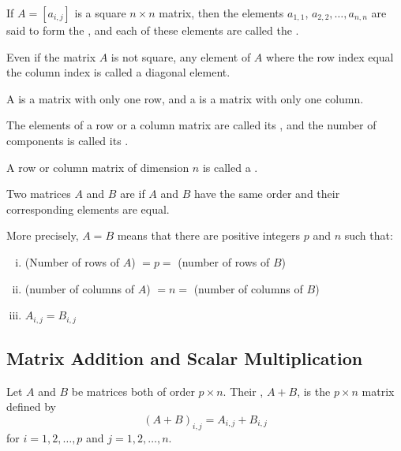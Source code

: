 \begin{definition}
  If $A = \left[a_{i, j}\right]$ is a square $n \times n$ matrix, then the elements $a_{1,1}$, $a_{2,2}, \dots, a_{n,n}$
  are said to form the , and each of these elements are called the
  .
\end{definition}

\begin{remark}
 Even if the matrix $A$ is not square, any element of $A$ where the row index equal the column index is called a 
 diagonal element.
\end{remark}

\begin{definition}
  A  is a matrix with only one row, and a  is a matrix with only one column.
\end{definition}

\begin{definition}
  The elements of a row or a column matrix are called its , and the number of components is called its .
\end{definition}

\begin{definition}
  A row or column matrix of dimension $n$ is called a .
\end{definition}

\begin{definition}
  Two matrices $A$ and $B$ are  if $A$ and $B$ have the same order and their corresponding elements are equal.

  More precisely, $A = B$ means that there are positive integers $p$ and $n$ such that:
  \begin{enumerate}[(i)]
    \item (Number of rows of $A$) $= p = $ (number of rows of $B$)
    \item (number of columns of $A$) $= n =$ (number of columns of $B$)
    \item $A_{i, j} = B_{i, j}$
  \end{enumerate}
\end{definition}

\subsection{Matrix Addition and Scalar Multiplication}
\begin{definition}
  Let $A$ and $B$ be matrices both of order $p \times n$.
  Their , $A + B$, is the $p \times n$ matrix defined by
  \begin{equation*}
    \left(A + B\right)_{i, j} = A_{i, j} + B_{i, j}
  \end{equation*}
  for $i = 1, 2, \dots, p$ and $j = 1, 2, \dots, n$.
\end{definition}

